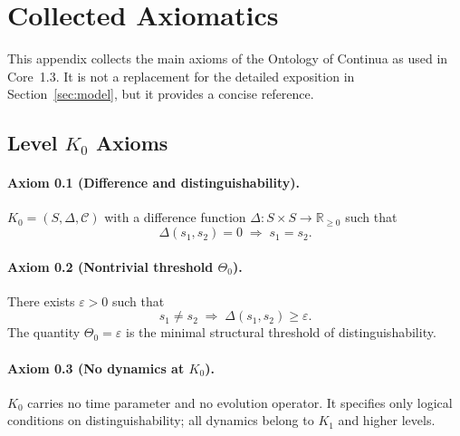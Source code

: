 
\section{Collected Axiomatics}
\label{app:axioms-full}

This appendix collects the main axioms of the Ontology of Continua as used in
Core~1.3.  It is not a replacement for the detailed exposition in
Section~\ref{sec:model}, but it provides a concise reference.

\subsection{Level \texorpdfstring{$K_0$}{K0} Axioms}

\paragraph{Axiom 0.1 (Difference and distinguishability).}
\(K_0 = (S,\Delta,\mathcal{C})\) with a difference function
\(\Delta : S\times S \to \mathbb{R}_{\ge 0}\) such that
\[
  \Delta(s_1,s_2) = 0 \;\Rightarrow\; s_1 = s_2.
\]

\paragraph{Axiom 0.2 (Nontrivial threshold \texorpdfstring{\(\Theta_0\)}{\Theta_0}).}
There exists \(\varepsilon>0\) such that
\[
  s_1\neq s_2 \;\Rightarrow\; \Delta(s_1,s_2)\ge\varepsilon.
\]
The quantity \(\Theta_0=\varepsilon\) is the minimal structural threshold of
distinguishability.

\paragraph{Axiom 0.3 (No dynamics at \texorpdfstring{\(K_0\)}{K_0}).}
\(K_0\) carries no time parameter and no evolution operator.  It specifies only
logical conditions on distinguishability; all dynamics belong to \(K_1\) and
higher levels.

